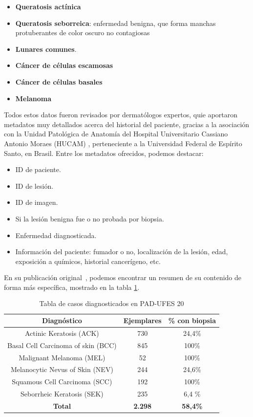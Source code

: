 \begin{itemize}
	\item \textbf{Queratosis actínica}
	\item \textbf{Queratosis seborreica}: enfermedad benigna, que forma manchas protuberantes de color oscuro no contagiosas
	\item \textbf{Lunares comunes}.
	\item \textbf{Cáncer de células escamosas}
	\item \textbf{Cáncer de células basales}
	\item \textbf{Melanoma}
	\end{itemize}

 Todos estos datos fueron revisados por dermatólogos expertos, quie aportaron metadatos muy detallados acerca del historial del paciente, gracias a la asociación con la Unidad Patológica de Anatomía del Hospital Universitario Cassiano Antonio Moraes (HUCAM) , perteneciente a la Universidad Federal de Espírito Santo, en Brasil. Entre los metadatos ofrecidos, podemos destacar:

\begin{itemize}
	\item ID de paciente.
	\item ID de lesión.
	\item ID de imagen.
	\item Si la lesión benigna fue o no probada por biopsia.
	\item Enfermedad diagnosticada.
	\item Información del paciente: fumador o no, localización de la lesión, edad, exposición a químicos, historial cancerígeno, etc.
\end{itemize}

En su publicación original~\cite{PACHECO2020106221}, podemos encontrar un resumen de su contenido de forma más específica, mostrado en la tabla \ref{tab:casospadufes}.

\begin{table}[!ht]
	\centering
	\begin{tabular}{|c|c|c|}
		\hline
		\textbf{Diagnóstico} & \textbf{Ejemplares} & \textbf{\% con biopsia} \\ \hline
		Actinic Keratosis (ACK) & 730 & 24,4\% \\ \hline
		Basal Cell Carcinoma of skin (BCC) & 845 & 100\% \\ \hline
		Malignant Melanoma (MEL) & 52 & 100\% \\ \hline
		Melanocytic Nevus of Skin (NEV) & 244 & 24,6\% \\ \hline
		Squamous Cell Carcinoma (SCC) & 192 & 100\% \\ \hline
		Seborrheic Keratosis (SEK)	&235	&6,4 \% \\ \hline
		\textbf{Total} & \textbf{2.298} & \textbf{58,4\%} \\ \hline
	\end{tabular}
	\caption{Tabla de casos diagnosticados en PAD-UFES 20}
	\label{tab:casospadufes}
\end{table}

